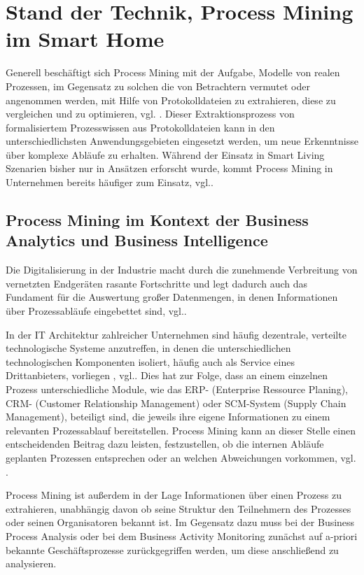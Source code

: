 \chapter{Stand der Technik, Process Mining im Smart Home}\label{chap:stateoftheart}
Generell beschäftigt sich Process Mining mit der Aufgabe, Modelle von realen Prozessen, im Gegensatz zu solchen die von Betrachtern vermutet oder angenommen werden, mit Hilfe von Protokolldateien zu extrahieren, diese zu vergleichen und zu optimieren, vgl. \cite{PMinAction}.
Dieser Extraktionsprozess von formalisiertem Prozesswissen aus Protokolldateien kann in den  unterschiedlichsten Anwendungsgebieten eingesetzt werden, um neue Erkenntnisse über komplexe Abläufe zu erhalten. Während der Einsatz in Smart Living Szenarien bisher nur in Ansätzen erforscht wurde, kommt Process Mining in Unternehmen bereits häufiger zum Einsatz, vgl.\cite{litreview}.

\section{Process Mining im Kontext der Business Analytics und Business Intelligence}

Die Digitalisierung in der Industrie macht durch die zunehmende Verbreitung von vernetzten Endgeräten rasante Fortschritte und legt dadurch auch das Fundament für die Auswertung großer Datenmengen, in denen Informationen über Prozessabläufe eingebettet sind, vgl.\cite{GanscharGerlac}. 

In der IT Architektur zahlreicher Unternehmen sind häufig dezentrale, verteilte technologische Systeme anzutreffen, in denen die unterschiedlichen technologischen Komponenten isoliert, häufig auch als Service eines Drittanbieters, vorliegen , vgl.\cite{GanscharGerlac}. Dies hat zur Folge, dass an einem einzelnen Prozess unterschiedliche Module, wie das ERP- (Enterprise Ressource Planing), CRM- (Customer Relationship Management) oder SCM-System (Supply Chain Management), beteiligt sind, die jeweils ihre eigene Informationen zu einem relevanten Prozessablauf bereitstellen. Process Mining kann an dieser Stelle einen entscheidenden Beitrag dazu leisten, festzustellen, ob die internen Abläufe geplanten Prozessen entsprechen oder an welchen Abweichungen vorkommen, vgl. \cite{PMinAction}.

Process Mining ist außerdem in der Lage Informationen über einen Prozess zu extrahieren, unabhängig davon ob seine Struktur den Teilnehmern des Prozesses oder seinen Organisatoren bekannt ist. Im Gegensatz dazu muss bei der Business Process Analysis oder bei dem Business Activity Monitoring zunächst auf a-priori bekannte Geschäftsprozesse zurückgegriffen werden, um diese anschließend zu analysieren. 


